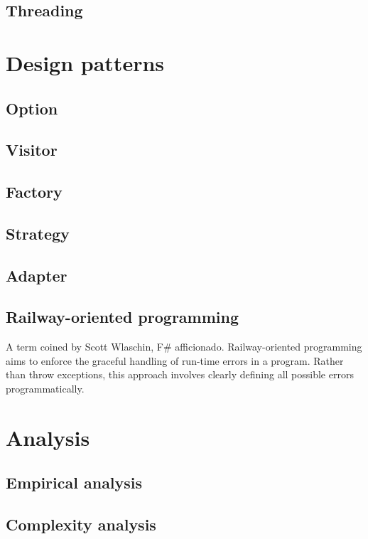 \documentclass{article}
\begin{document}
\subsection{Threading}

\newpage

\section{Design patterns}
\subsection{Option}
\subsection{Visitor}
\subsection{Factory}
\subsection{Strategy}
\subsection{Adapter}
\subsection{Railway-oriented programming}
A term coined by Scott Wlaschin, F\# afficionado.
Railway-oriented programming aims to enforce the graceful handling of run-time errors in a program.
Rather than throw exceptions, this approach involves clearly defining all possible errors programmatically.

\newpage

\section{Analysis}
\subsection{Empirical analysis}


\subsection{Complexity analysis}

\newpage
\end{document}
